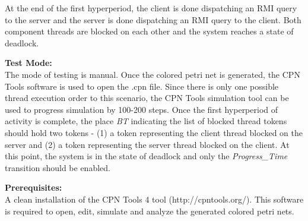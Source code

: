 At the end of the first hyperperiod, the client is done dispatching an RMI query to the server and the server is done dispatching an RMI query to the client. Both component threads are blocked on each other and the system reaches a state of deadlock.

\noindent\textbf{Test Mode:}\\
The mode of testing is manual. Once the colored petri net is generated, the CPN Tools software is used to open the .cpn file. Since there is only one possible thread execution order to this scenario, the CPN Tools simulation tool can be used to progress simulation by 100-200 steps. Once the first hyperperiod of activity is complete, the place \emph{BT} indicating the list of blocked thread tokens should hold two tokens - (1) a token representing the client thread blocked on the server and (2) a token representing the server thread blocked on the client. At this point, the system is in the state of deadlock and only the \emph{Progress\_Time} transition should be enabled. 

\noindent\textbf{Prerequisites:}\\
A clean installation of the CPN Tools 4 tool (http://cpntools.org/). This software is required to open, edit, simulate and analyze the generated colored petri nets. 
